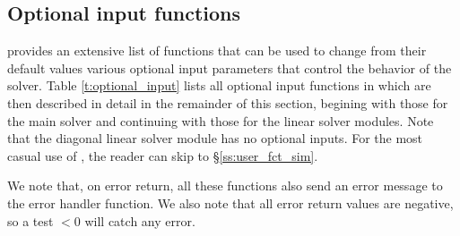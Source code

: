 \subsection{Optional input functions}\label{ss:optional_input}

{\cvode} provides an extensive list of functions that can be used to change
from their default values various optional input parameters that control the
behavior of the {\cvode} solver. 
Table \ref{t:optional_input} lists all optional input functions in {\cvode} which 
are then described in detail in the remainder of this section, begining with those
for the main {\cvode} solver and continuing with those for the linear solver
modules. Note that the diagonal linear solver module has no optional inputs.
For the most casual use of {\cvode}, the reader can skip to \S\ref{ss:user_fct_sim}.

We note that, on error return, all these functions also send an error message
to the error handler function.
We also note that all error return values are negative, so a test $<0$
will catch any error.

